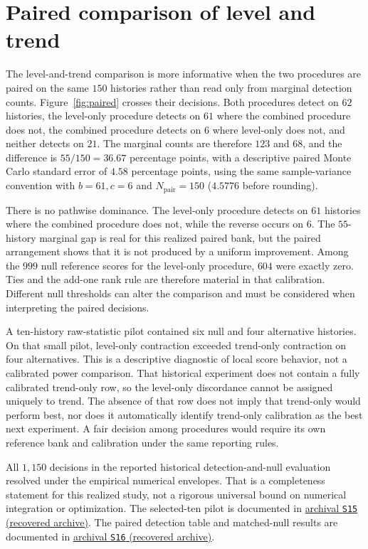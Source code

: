 \section{Paired comparison of level and trend}

The level-and-trend comparison is more informative when the two procedures are paired on the same \(150\) histories rather than read only from marginal detection counts. Figure~\ref{fig:paired} crosses their decisions. Both procedures detect on \(62\) histories, the level-only procedure detects on \(61\) where the combined procedure does not, the combined procedure detects on \(6\) where level-only does not, and neither detects on \(21\). The marginal counts are therefore \(123\) and \(68\), and the difference is \(55/150=36.67\) percentage points, with a descriptive paired Monte Carlo standard error of \(4.58\) percentage points, using the same sample-variance convention with \(b=61,c=6\) and \(N_{\mathrm{pair}}=150\) (\(4.5776\) before rounding).

There is no pathwise dominance. The level-only procedure detects on \(61\) histories where the combined procedure does not, while the reverse occurs on \(6\). The \(55\)-history marginal gap is real for this realized paired bank, but the paired arrangement shows that it is not produced by a uniform improvement. Among the \(999\) null reference scores for the level-only procedure, \(604\) were exactly zero. Ties and the add-one rank rule are therefore material in that calibration. Different null thresholds can alter the comparison and must be considered when interpreting the paired decisions.

A ten-history raw-statistic pilot contained six null and four alternative histories. On that small pilot, level-only contraction exceeded trend-only contraction on four alternatives. This is a descriptive diagnostic of local score behavior, not a calibrated power comparison. That historical experiment does not contain a fully calibrated trend-only row, so the level-only discordance cannot be assigned uniquely to trend. The absence of that row does not imply that trend-only would perform best, nor does it automatically identify trend-only calibration as the best next experiment. A fair decision among procedures would require its own reference bank and calibration under the same reporting rules.

All \(1{,}150\) decisions in the reported historical detection-and-null evaluation resolved under the empirical numerical envelopes. That is a completeness statement for this realized study, not a rigorous universal bound on numerical integration or optimization. The selected-ten pilot is documented in \hyperlink{S15}{archival \texttt{S15} (recovered archive)}. The paired detection table and matched-null results are documented in \hyperlink{S16}{archival \texttt{S16} (recovered archive)}.


